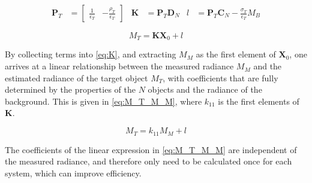 \documentclass[11pt,a4paper]{article}
\begin{document}
\begin{align*}
\bm{P}_T &= \begin{bmatrix} \frac{1}{\epsilon_T} & - \frac{\rho_T}{\epsilon_T} \end{bmatrix} &
\bm{K} &= \bm{P}_T \bm{D}_N &
l &= \bm{P}_T \bm{C}_N - \frac{\sigma_T}{\epsilon_T} M_B
\end{align*}

\begin{equation}\label{eq:K}
	M_T = \bm{K} \bm{X}_0 + l
\end{equation}

By collecting terms into \cref{eq:K}, and extracting $ M_M $ as the first element of $ \bm{X}_0 $, one arrives at a linear relationship between the measured radiance $ M_M $ and the estimated radiance of the target object $ M_T $, with coefficients that are fully determined by the properties of the $ N $ objects and the radiance of the background. This is given in \cref{eq:M_T_M_M}, where $ k_{11} $ is the first elements of $ \bm{K} $.

\begin{equation}\label{eq:M_T_M_M}
	M_T = k_{11} M_M + l
\end{equation}

The coefficients of the linear expression in \cref{eq:M_T_M_M} are independent of the measured radiance, and therefore only need to be calculated once for each system, which can improve efficiency.
\end{document}
